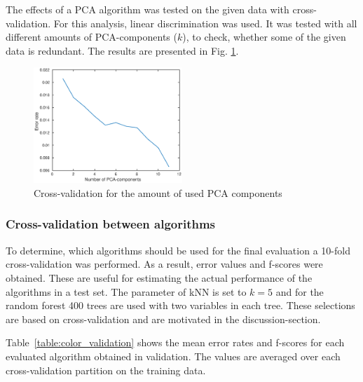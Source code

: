 \documentclass[twoside]{article}
\begin{document}
\begin{multicols}{2}
The effects of a PCA algorithm was tested on the given data with cross-validation. 
For this analysis, linear discrimination was used. It was tested with all different
amounts of PCA-components ($k$), to check, whether some of the given data is redundant.
The results are presented in Fig. \ref{fig:lindiscrpca}.

\begin{figure}[H]
\centering
\includegraphics[width=0.5\textwidth]{lindiskrpca}
\caption{Cross-validation for the amount of used PCA components}
\label{fig:lindiscrpca}
\end{figure}

\subsubsection{Cross-validation between algorithms}

To determine, which algorithms should be used for the final evaluation a 10-fold cross-validation was performed. As a result, error values and f-scores were obtained.
These are useful for estimating the actual performance of the algorithms in a test set. The parameter of 
kNN is set to $k = 5$ and for the random forest 400 trees are used with two variables in each tree. These
selections are based on cross-validation and are motivated in the discussion-section.

Table~\ref{table:color_validation} shows the mean error rates and f-scores for each evaluated algorithm obtained in validation. The values are averaged over each
cross-validation partition on the training data.


\end{multicols}
\end{document}

